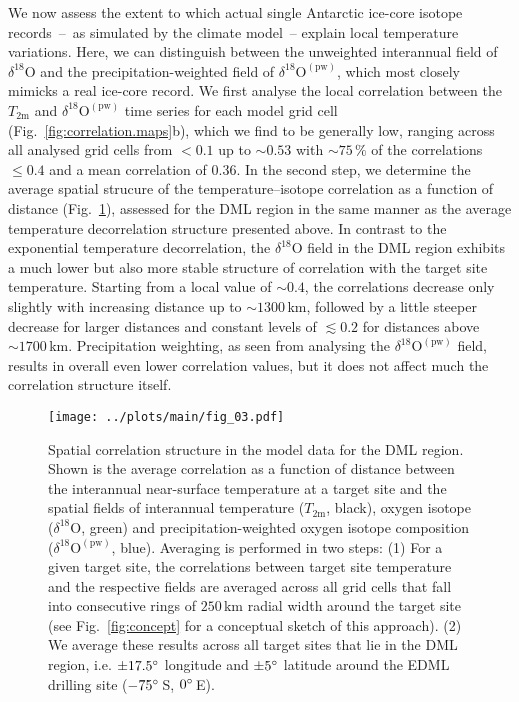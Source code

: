 \documentclass[cp, manuscript]{copernicus}
\begin{document}
We now assess the extent to which actual single Antarctic ice-core isotope
records~--~as simulated by the climate model~-- explain local temperature
variations. Here, we can distinguish between the unweighted interannual field of
$\delta^{18}\mathrm{O}$ and the precipitation-weighted field of
$\delta^{18}\mathrm{O}^{\mathrm{(pw)}}$, which most closely mimicks a real
ice-core record. We first analyse the local correlation between the
$T_{2\mathrm{m}}$ and $\delta^{18}\mathrm{O}^{\mathrm{(pw)}}$ time series for
each model grid cell (Fig.~\ref{fig:correlation.maps}b), which we find to be
generally low, ranging across all analysed grid cells from $<0.1$ up to
$\sim0.53$ with $\sim75\,\%$ of the correlations $\leq0.4$ and a mean
correlation of $0.36$. In the second step, we determine the average spatial
strucure of the temperature--isotope correlation as a function of distance
(Fig.~\ref{fig:avg.decor.lengths}), assessed for the DML region in the same
manner as the average temperature decorrelation structure presented above. In
contrast to the exponential temperature decorrelation, the
$\delta^{18}\mathrm{O}$ field in the DML region exhibits a much lower but also
more stable structure of correlation with the target site temperature. Starting
from a local value of $\sim0.4$, the correlations decrease only slightly with
increasing distance up to $\sim1300$\,km, followed by a little steeper decrease
for larger distances and constant levels of $\lesssim0.2$ for distances above
$\sim1700$\,km. Precipitation weighting, as seen from analysing the
$\delta^{18}\mathrm{O}^{\mathrm{(pw)}}$ field, results in overall even lower
correlation values, but it does not affect much the correlation structure
itself.

\begin{figure}[t]%
\centering
\texttt{[image: ../plots/main/fig\_03.pdf]}
\caption{%
  Spatial correlation structure in the model data for the DML region. Shown is
  the average correlation as a function of distance between the interannual
  near-surface temperature at a target site and the spatial fields of
  interannual temperature ($T_{2\mathrm{m}}$, black), oxygen isotope
  ($\delta^{18}\mathrm{O}$, green) and precipitation-weighted oxygen isotope
  composition ($\delta^{18}\mathrm{O}^{\mathrm{(pw)}}$, blue). Averaging is
  performed in two steps: (1) For a given target site, the correlations between
  target site temperature and the respective fields are averaged across all grid
  cells that fall into consecutive rings of $250$\,km radial width around the
  target site (see Fig.~\ref{fig:concept} for a conceptual sketch of this
  approach). (2) We average these results across all target sites that lie in
  the DML region, i.e. $\pm17.5^{\circ}$ longitude and $\pm5^{\circ}$ latitude
  around the EDML drilling site ($-75^{\circ}$\,S, $0^{\circ}$\,E).}
\label{fig:avg.decor.lengths}%
\end{figure}%
\end{document}
